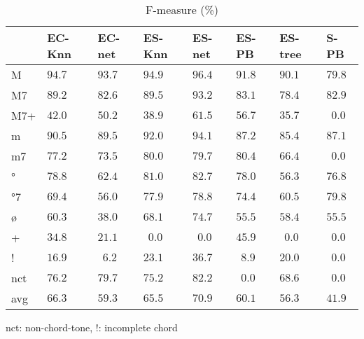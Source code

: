 \documentclass{article}
\begin{document}
\begin{table}
  \centering
  \begin{tabular}{l|p{.5cm}p{.5cm}p{.5cm}p{.5cm}p{.5cm}p{.5cm}p{.5cm}}
         
   &EC-Knn &EC-net &ES-Knn &ES-net &ES-PB  &ES-tree&S-PB   \\
\hline                                            
M  & $94.7$&$ 93.7$&$ 94.9$&$ \mathbf{96.4}$&$ 91.8$&$ 90.1$&$ 79.8$\\
M7 & $89.2$&$ 82.6$&$ 89.5$&$\mathbf{93.2} $&$ 83.1$&$ 78.4$&$ 82.9$\\
M7+& $42.0$&$ 50.2$&$ 38.9$&$ \mathbf{61.5}$&$ 56.7$&$ 35.7$&$~~0.0$\\
m  & $90.5$&$ 89.5$&$ 92.0$&$\mathbf{94.1} $&$ 87.2$&$ 85.4$&$ 87.1$\\
m7 & $77.2$&$ 73.5$&$ 80.0$&$ 79.7$&$ \mathbf{80.4}$&$ 66.4$&$~~0.0$\\
°  & $78.8$&$ 62.4$&$ 81.0$&$\mathbf{82.7} $&$ 78.0$&$ 56.3$&$ 76.8$\\
°7 & $69.4$&$ 56.0$&$ 77.9$&$ 78.8$&$ 74.4$&$ 60.5$&$\mathbf{79.8} $\\
ø  & $60.3$&$ 38.0$&$ 68.1$&$ \mathbf{74.7}$&$ 55.5$&$ 58.4$&$ 55.5$\\
+  & $34.8$&$ 21.1$&$~~0.0$&$~~0.0$&$\mathbf{45.9} $&$~~0.0$&$~~0.0$\\
!  & $16.9$&$~~6.2$&$ 23.1$&$\mathbf{36.7} $&$~~8.9$&$ 20.0$&$~~0.0$\\
nct& $76.2$&$ 79.7$&$ 75.2$&$ \mathbf{82.2}$&$~~0.0$&$ 68.6$&$~~0.0$\\
avg& $66.3$&$ 59.3$&$ 65.5$&$ \mathbf{70.9}$&$ 60.1$&$ 56.3$&$ 41.9$\\

  \end{tabular}                                                        

\medskip

nct: non-chord-tone, !: incomplete chord
  \caption{F-measure (\%)}
  \label{tab:f-measure}
\end{table}
\end{document}
